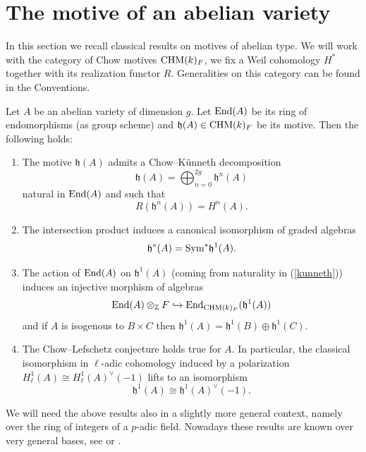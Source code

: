 \documentclass[11pt]{amsart}
\begin{document}
\section{The motive of an abelian variety}\label{reminder}





In this section we recall classical results on motives of abelian type. We will work with the category of Chow motives $\mathrm{CHM}(k)_{F}$, we fix a Weil cohomology $H^*$ together with its realization functor $R$. Generalities on this category   can be found in the  Conventions. 
\begin{theorem}\label{classic} Let $A$ be an abelian variety of dimension  $g$. Let $\textnormal{End}(A)$ be its ring of endomorphisms (as group scheme) and $\mathfrak{h}(A)\in \mathrm{CHM}(k)_{F}$ be its motive. Then the following holds:
\begin{enumerate}
\item\label{kunneth} \cite{DeMu} The motive $\mathfrak{h}(A)$ admits a Chow--K\"unneth decomposition 
\[\mathfrak{h}(A)=\bigoplus_{n=0}^{2g} \mathfrak{h}^n(A)\] natural in $\textnormal{End}(A)$ and such that 
\[R(\mathfrak{h}^n(A))= H^n(A).\] 
\item\label{kunn} \cite{Ku1} The intersection product induces a canonical isomorphism of graded algebras \[\mathfrak{h}^*(A)=\textnormal{Sym}^* \mathfrak{h}^1(A).\]
\item\label{kings}   \cite[Proposition 2.2.1]{Ki}  The action of $\textnormal{End}(A)$ on $\mathfrak{h}^1(A)$ (coming from naturality in (\ref{kunneth}))  induces an injective morphism of algebras  \[\textnormal{End}(A)\otimes_{\mathbb{Z}}F \hookrightarrow \textnormal{End}_{\mathrm{CHM}(k)_{F}}(\mathfrak{h}^1(A))\]
and if $A$ is isogenous to $B\times C$ then $\mathfrak{h}^1(A) =  \mathfrak{h}^1(B) \oplus \mathfrak{h}^1(C) .$
\item\label{polarization}   \cite{Ku2} The Chow--Lefschetz conjecture holds true for $A$. In particular, the classical isomorphism in $\ell$-adic cohomology  induced by a polarization $H_{\ell}^1(A)\cong H_{\ell}^1(A)^{\vee}(-1)$ lifts to an isomorphism
 \[\mathfrak{h}^1(A)\cong\mathfrak{h}^1(A)^{\vee}(-1).\] 
\end{enumerate}
\end{theorem}
\begin{remark}\label{AHP}
We will need the above results also  in a slightly more general context, namely over the ring of integers of a $p$-adic field. Nowadays these results are known over very general bases, see \cite[Theorem 5.1.6]{OS2} or \cite[Theorem 3.3]{AHP}.
\end{remark}
\end{document}

